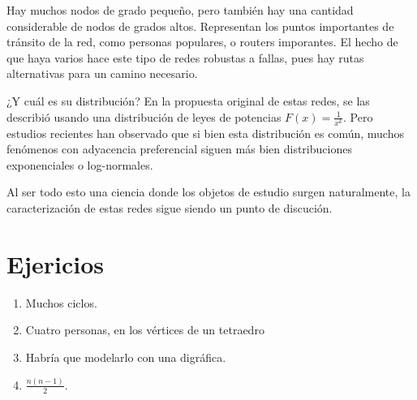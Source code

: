 \documentclass[12pt]{extreport}
\begin{document}
	Hay muchos nodos de grado pequeño, pero también hay una cantidad
	considerable de nodos de grados altos. Representan los puntos importantes de
	tránsito de la red, como personas populares, o routers imporantes. El hecho
	de que haya varios hace este tipo de redes robustas a fallas, pues hay rutas
	alternativas para un camino necesario.

	¿Y cuál es su distribución? En la propuesta original de estas redes, se las
	describió usando una distribución de leyes de potencias $F(x) = 
	\frac{1}{x^k}$. Pero estudios recientes han observado que si bien esta
	distribución es común, muchos fenómenos con adyacencia preferencial siguen 
	más bien distribuciones exponenciales o log-normales.

	Al ser todo esto una ciencia donde los objetos de estudio surgen 
	naturalmente, la caracterización de estas redes sigue siendo un punto de 
	discución.

	\section*{Ejericios}

	\begin{enumerate}
		\item Muchos ciclos.
		\item Cuatro personas, en los vértices de un tetraedro
		\item Habría que modelarlo con una digráfica.
		\item $\frac{n(n-1)}{2}$.
	\end{enumerate}
\end{document}
